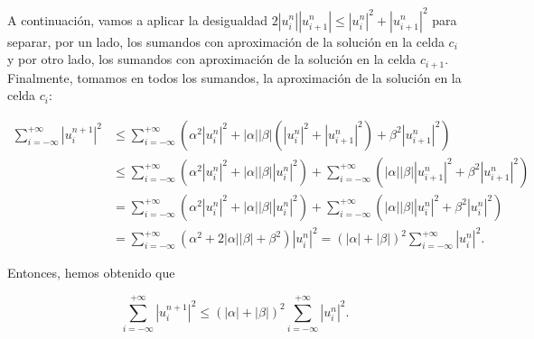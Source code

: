 \begin{example}
  A continuación, vamos a aplicar la desigualdad
  \begin{math}
    2
    \left|u^{n}_{i}\right|
    \left|u^{n}_{i+1}\right|\leq
    {\left|u^{n}_{i}\right|}^{2}+
    {\left|u^{n}_{i+1}\right|}^{2}
  \end{math}
  para separar, por un lado, los sumandos con aproximación de la
  solución en la celda $c_{i}$ y por otro lado, los sumandos con
  aproximación de la solución en la celda $c_{i+1}$.
  Finalmente, tomamos en todos los sumandos, la aproximación de la
  solución en la celda $c_{i}$:

  \begin{align*}
    \sum_{i=-\infty}^{+\infty}
    {\left|u^{n+1}_{i}\right|}^{2} & \leq
    \sum_{i=-\infty}^{+\infty}
    \left(
    \alpha^{2}
    {\left|u^{n}_{i}\right|}^{2}+
    \left|\alpha\right|
    \left|\beta\right|
    \left(
    \left|u^{n}_{i}\right|^{2}+
    \left|u^{n}_{i+1}\right|^{2}
    \right)+
    \beta^{2}
    {\left|u^{n}_{i+1}\right|}^{2}
    \right)                               \\
                                   & \leq
    \sum_{i=-\infty}^{+\infty}
    \left(
    \alpha^{2}
    \left|u^{n}_{i}\right|^{2}+
    \left|\alpha\right|
    \left|\beta\right|
    {\left|u^{n}_{i}\right|}^{2}
    \right)+
    \sum_{i=-\infty}^{+\infty}
    \left(
    \left|\alpha\right|
    \left|\beta\right|
    {\left|u^{n}_{i+1}\right|}^{2}+
    \beta^{2}
    {\left|u^{n}_{i+1}\right|}^{2}
    \right)                               \\
                                   & =
    \sum_{i=-\infty}^{+\infty}
    \left(
    \alpha^{2}
    {\left|u^{n}_{i}\right|}^{2}+
    \left|\alpha\right|
    \left|\beta\right|
    \left|u^{n}_{i}\right|^{2}
    \right)+
    \sum_{i=-\infty}^{+\infty}
    \left(
    \left|\alpha\right|
    \left|\beta\right|
    \left|u^{n}_{i}\right|^{2}+
    \beta^{2}
    {\left|u^{n}_{i}\right|}^{2}
    \right)                               \\
                                   & =
    \sum_{i=-\infty}^{+\infty}
    \left(
    \alpha^{2}+
    2\left|\alpha\right|
    \left|\beta\right|+
    \beta^{2}
    \right)
    \left|u^{n}_{i}\right|^{2}=
      {\left(\left|\alpha\right|+\left|\beta\right|\right)}^{2}
    \sum_{i=-\infty}^{+\infty}
    {\left|u^{n}_{i}\right|}^{2}.
  \end{align*}

  Entonces, hemos obtenido que

  \begin{equation*}
    \sum_{i=-\infty}^{+\infty}
    {\left|u^{n+1}_{i}\right|}^{2}\leq
    {
      \left(\left|\alpha\right|+
      \left|\beta\right|\right)
    }^{2}
    \sum_{i=-\infty}^{+\infty}
    {\left|u^{n}_{i}\right|}^{2}.
  \end{equation*}


\end{example}
